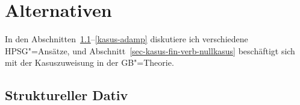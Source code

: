 {}




\section{Alternativen}
\label{sec-kasus-alternativen}

In den Abschnitten~\ref{sec-alternativen-struc-dativ}--\ref{kasus-adamp} diskutiere ich verschiedene HPSG"=Ansätze,
und Abschnitt~\ref{sec-kasus-fin-verb-nullkasus} beschäftigt sich mit der Kasuszuweisung in der GB"=Theorie.

\subsection{Struktureller Dativ}
\label{sec-alternativen-struc-dativ}

